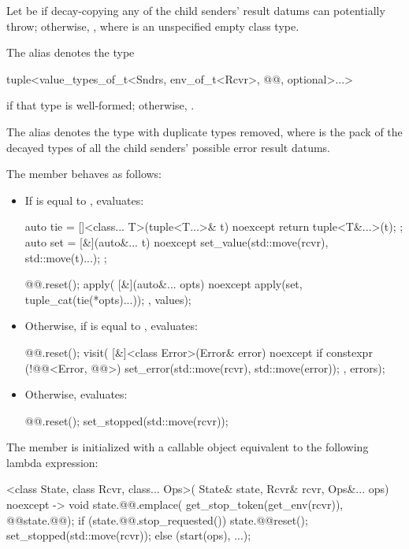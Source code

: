 \pnum
Let  be 
if decay-copying any of the child senders' result datums can potentially throw;
otherwise, ,
where  is an unspecified empty class type.

\pnum
The alias  denotes the type
\begin{codeblock}
tuple<value_types_of_t<Sndrs, env_of_t<Rcvr>, @@, optional>...>
\end{codeblock}
if that type is well-formed; otherwise, .

\pnum
The alias  denotes
the type 
with duplicate types removed,
where  is the pack of the decayed types
of all the child senders' possible error result datums.

\pnum
The member
behaves as follows:
\begin{itemize}
\item
If  is equal to ,
evaluates:
\begin{codeblock}
auto tie = []<class... T>(tuple<T...>& t) noexcept { return tuple<T&...>(t); };
auto set = [&](auto&... t) noexcept { set_value(std::move(rcvr), std::move(t)...); };

@@.reset();
apply(
  [&](auto&... opts) noexcept {
    apply(set, tuple_cat(tie(*opts)...));
  },
  values);
\end{codeblock}
\item
Otherwise,
if  is equal to ,
evaluates:
\begin{codeblock}
@@.reset();
visit(
  [&]<class Error>(Error& error) noexcept {
    if constexpr (!@@<Error, @@>) {
      set_error(std::move(rcvr), std::move(error));
    }
  },
  errors);
\end{codeblock}
\item
Otherwise, evaluates:
\begin{codeblock}
@@.reset();
set_stopped(std::move(rcvr));
\end{codeblock}
\end{itemize}

\pnum
The member 
is initialized with a callable object
equivalent to the following lambda expression:
\begin{codeblock}
[]<class State, class Rcvr, class... Ops>(
    State& state, Rcvr& rcvr, Ops&... ops) noexcept -> void {
  state.@@.emplace(
    get_stop_token(get_env(rcvr)),
    @@{state.@@});
  if (state.@@.stop_requested()) {
    state.@@reset();
    set_stopped(std::move(rcvr));
  } else {
    (start(ops), ...);
  }
}
\end{codeblock}

